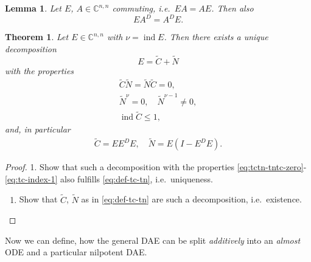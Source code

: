 \documentclass[]{book}
\providecommand{\tightlist}{%
  \setlength{\itemsep}{0pt}\setlength{\parskip}{0pt}}
\newtheorem{theorem}{Theorem}[chapter]
\newtheorem{lemma}{Lemma}[chapter]
\theoremstyle{definition}
\theoremstyle{definition}
\theoremstyle{definition}
\theoremstyle{definition}
\theoremstyle{remark}
\begin{document}
\begin{lemma}
\protect\hypertarget{lem:ae-commute-ade-commute}{}{\label{lem:ae-commute-ade-commute} }Let \(E\), \(A \in \mathbb C^{n,n}\) commuting, i.e.~\(EA=AE\). Then also
\begin{equation}
EA^D = A^DE. \label{eq:commute-ea-ead-ade}
\end{equation}
\end{lemma}

\begin{theorem}
\protect\hypertarget{thm:decomposition-e-cpn}{}{\label{thm:decomposition-e-cpn} }Let \(E\in \mathbb C^{n,n}\) with \(\nu = \operatorname{ind}E\). Then there exists a unique decomposition
\[
E=\tilde C + \tilde N
\]
with the properties
\begin{align}
\tilde C \tilde N = \tilde N \tilde C = 0, \label{eq:tctn-tntc-zero} \\
\tilde N^\nu = 0, \quad \tilde N^{\nu-1} \neq 0, \label{eq:tn-nilpotent}\\
\operatorname{ind}\tilde C \leq 1, \label{eq:tc-index-1}
\end{align}
and, in particular
\begin{align}
\tilde C = EE^DE, \quad \tilde N = E(I - E^DE). \label{eq:def-tc-tn}
\end{align}
\end{theorem}

\begin{proof}
{}
1. Show that such a decomposition with the properties \eqref{eq:tctn-tntc-zero}-\eqref{eq:tc-index-1} also fulfills \eqref{eq:def-tc-tn}, i.e.~uniqueness.

\begin{enumerate}
\def\labelenumi{\arabic{enumi}.}
\setcounter{enumi}{1}
\tightlist
\item
  Show that \(\tilde C\), \(\tilde N\) as in \eqref{eq:def-tc-tn} are such a decomposition, i.e.~existence.
\end{enumerate}
\end{proof}

Now we can define, how the general DAE can be split \emph{additively} into an \emph{almost} ODE and a particular nilpotent DAE.
\end{document}
